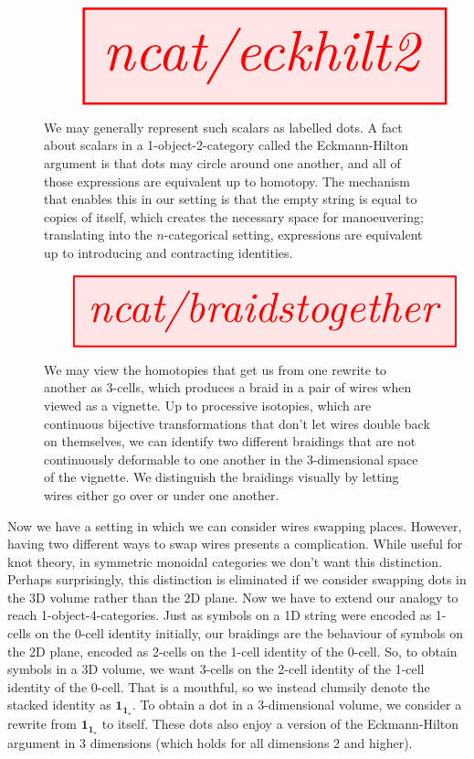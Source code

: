 \begin{figure}
\centering
\[\resizebox{\textwidth}{!}{\tikzfig{ncat/eckhilt2}}\]
\caption{We may generally represent such scalars as labelled dots. A fact about scalars in a 1-object-2-category called the Eckmann-Hilton argument is that dots may circle around one another, and all of those expressions are equivalent up to homotopy. The mechanism that enables this in our setting is that the empty string is equal to copies of itself, which creates the necessary space for manoeuvering; translating into the $n$-categorical setting, expressions are equivalent up to introducing and contracting identities.}
\end{figure}

\vspace{3cm}

\begin{figure}[h!]
\centering
\[\resizebox{\textwidth}{!}{\tikzfig{ncat/braidstogether}}\]
\caption{We may view the homotopies that get us from one rewrite to another as 3-cells, which produces a braid in a pair of wires when viewed as a vignette. Up to processive isotopies, which are continuous bijective transformations that don't let wires double back on themselves, we can identify two different braidings that are not continuously deformable to one another in the 3-dimensional space of the vignette. We distinguish the braidings visually by letting wires either go over or under one another.}
\end{figure}

\vspace{3cm}

\newpage

Now we have a setting in which we can consider wires swapping places. However, having two different ways to swap wires presents a complication. While useful for knot theory, in symmetric monoidal categories we don't want this distinction. Perhaps surprisingly, this distinction is eliminated if we consider swapping dots in the 3D volume rather than the 2D plane. Now we have to extend our analogy to reach 1-object-4-categories. Just as symbols on a 1D string were encoded as 1-cells on the 0-cell identity initially, our braidings are the behaviour of symbols on the 2D plane, encoded as 2-cells on the 1-cell identity of the 0-cell. So, to obtain symbols in a 3D volume, we want 3-cells on the 2-cell identity of the 1-cell identity of the 0-cell. That is a mouthful, so we instead clumsily denote the stacked identity as $\textbf{1}_{\textbf{1}_\star}$. To obtain a dot in a 3-dimensional volume, we consider a rewrite from $\textbf{1}_{\textbf{1}_\star}$ to itself. These dots also enjoy a version of the Eckmann-Hilton argument in 3 dimensions (which holds for all dimensions 2 and higher).

